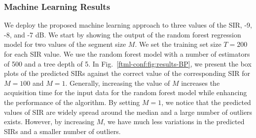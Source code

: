 \subsubsection{Machine Learning Results}\label{ftml-conf:sec:results-ML}
We deploy the proposed machine learning approach to three values of the SIR, -9, -8, and -7 dB. We start by showing the output of the random forest regression model for two values of the segment size $M$. We set the training set size $T=200$ for each SIR value. We use the random forest model with a number of estimators of 500 and a tree depth of 5. In Fig.~\ref{ftml-conf:fig:results-BP}, we present the box plots of the predicted SIRs against the correct value of the corresponding SIR for $M=100$ and $M=1$.  Generally, increasing the value of $M$ increases the acquisition time for the input data for the random forest model while enhancing the performance of the algorithm. By setting $M=1$, we notice that the predicted values of SIR are widely spread around the median and a large number of outliers exists. However, by increasing $M$, we have much less variations in the predicted SIRs and a smaller number of outliers.



